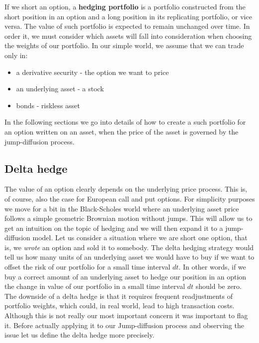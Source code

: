 \documentclass[times, utf8, diplomski]{fer}
\begin{document}
If we short an option, a \textbf{hedging portfolio} is a portfolio constructed from the short position in an option and a long position in its replicating portfolio, or vice versa. The value of such portfolio is expected to remain unchanged over time. In order it, we must consider which assets will fall into consideration when choosing the weights of our portfolio. In our simple world, we assume that we can trade only in:
\begin{itemize}
	\item a derivative security - the option we want to price
	\item an underlying asset - a stock
	\item bonds - riskless asset
\end{itemize}
\noindent In the following sections we go into details of how to create a such portfolio for an option written on an asset, when the price of the asset is governed by the jump-diffusion process.

\subsection{Delta hedge} \label{sec:delta_hedge}
The value of an option clearly depends on the underlying price process. This is, of course, also the case for European call and put options. For simplicity purposes we move for a bit in the Black-Scholes world where an underlying asset price follows a simple geometric Brownian motion without jumps. This will allow us to get an intuition on the topic of hedging and we will then expand it to a jump-diffusion model. 
Let us consider a situation where we are short one option, that is, we \textit{wrote} an option and sold it to somebody. The delta hedging strategy would tell us how many units of an underlying asset we would have to buy if we want to offset the risk of our portfolio for a small time interval $dt$. In other words, if we buy a correct amount of an underlying asset to hedge our position in an option the change in value of our portfolio in a small time interval $dt$ should be zero. The downside of a delta hedge is that it requires frequent readjustments of portfolio weights, which could, in real world, lead to high transaction costs. Although this is not really our most important concern it was important to flag it. Before actually applying it to our Jump-diffusion process and observing the issue let us define the delta hedge more precisely.
\end{document}
